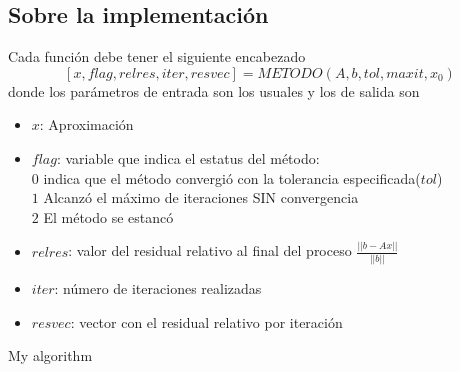 \documentclass{article}
\makeatletter
\def\BState{\State\hskip-\ALG@thistlm}
\makeatother
\begin{document}
\subsection*{Sobre la implementación}
Cada función debe tener el siguiente encabezado
$$[x, flag, relres, iter, resvec] = METODO(A,b,tol,maxit,x_0)$$
donde los parámetros de entrada son los usuales y los de salida son 
\begin{itemize}
\item $x$: Aproximación
\item $flag$: variable que indica el estatus del método:\\
$0$ indica que el método convergió con la tolerancia especificada($tol$)\\
$1$ Alcanzó el máximo de iteraciones SIN convergencia\\
$2$ El método se estancó
\item $relres$: valor del residual relativo al final del proceso $\frac{||b-Ax||}{||b||}$
\item $iter$: número de iteraciones realizadas
\item $resvec$: vector con el residual relativo por iteración
\end{itemize}
\begin{algorithm}[H]
\caption{My algorithm}\label{euclid}
\end{algorithm}
\end{document}

